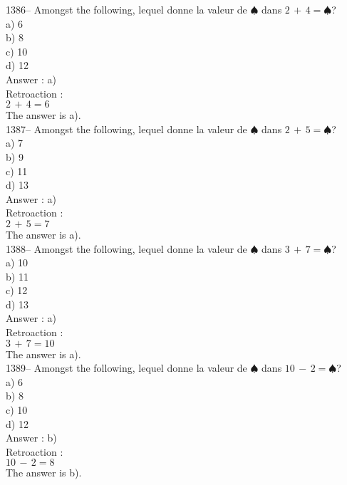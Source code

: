 ﻿\documentclass[letterpaper, 12pt]{article}
\begin{document}
1386-- Amongst the following, lequel donne la valeur de
$\spadesuit$ dans $2\,+\,4=\spadesuit$?\\
a) 6\\
b) 8\\
c) 10\\
d) 12\\

Answer : a)\\

Retroaction : \\
$2\,+\,4=6$\\
The answer is a).\\

1387-- Amongst the following, lequel donne la valeur de
$\spadesuit$ dans $2\,+\,5=\spadesuit$?\\
a) 7\\
b) 9\\
c) 11\\
d) 13\\

Answer : a)\\

Retroaction : \\
$2\,+\,5=7$\\
The answer is a).\\

1388-- Amongst the following, lequel donne la valeur de
$\spadesuit$ dans $3\,+\,7=\spadesuit$?\\
a) 10\\
b) 11\\
c) 12\\
d) 13\\

Answer : a)\\

Retroaction : \\
$3\,+\,7=10$\\
The answer is a).\\

1389-- Amongst the following, lequel donne la valeur de
$\spadesuit$ dans $10\,-\,2=\spadesuit$?\\
a) 6\\
b) 8\\
c) 10\\
d) 12\\

Answer : b)\\

Retroaction : \\
$10\,-\,2=8$\\
The answer is b).\\
\end{document}
